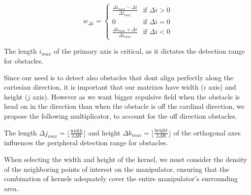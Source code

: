 \documentclass[letterpaper, 10 pt, conference]{ieeeconf}  %
\begin{document}
\begin{equation}
	w_{\Delta i} = 
	\begin{cases} 
	 	\frac{\Delta i_{max} - \Delta i}{\Delta i_{max}} & \text{if } \Delta i > 0 \\
		0 & \text{if } \Delta i = 0 \\
		\frac{\Delta i_{max} + \Delta i}{\Delta i_{max}}& \text{if } \Delta i < 0 
	\end{cases}
\end{equation}

The length $i_{max}$ of the primary axis is critical, as it dictates the detection range for obstacles. 



Since our need is to detect also obstacles that dont align perfectly along the cartesian direction, it is important that our matrixes have width ($i$ axis) and height ($j$ axis). However as we want bigger repulsive field when the obstacle is head on in the direction than when the obstacle is off the cardinal direction, we propose the following multiplicator, to account for the off direction obstacles.

The length $\Delta j_{max} = \lfloor \frac{\mathrm{width}}{2 \Delta \mathrm{R}} \rfloor$ and height $\Delta k_{max} = \lfloor \frac{\mathrm{height}}{2 \Delta \mathrm{R}} \rfloor$ of the orthogonal axes influences the peripheral detection range for obstacles. 


When selecting the width and height of the kernel, we must consider the density of the neighboring points of interest on the manipulator, ensuring that the combination of kernels adequately cover the entire manipulator's surrounding area. 
\end{document}
